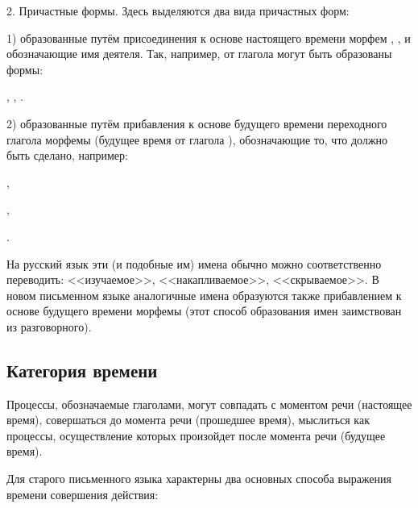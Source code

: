 2. Причастные формы. Здесь выделяются два вида причастных форм:

1) образованные путём присоединения к основе настоящего времени морфем , ,  и обозначающие имя деятеля. Так, например, от глагола  могут быть образованы формы:
\begin{prfsample}
	\item {}, , .
\end{prfsample}

2) образованные путём прибавления к основе будущего времени переходного глагола морфемы  (будущее время от глагола ), обозначающие то, что должно быть сделано, например:
\begin{prfsample}
	\item {},
	\item {},
	\item {}.
\end{prfsample}
На русский язык эти (и подобные им) имена обычно можно соответственно переводить: <<изучаемое>>, <<накапливаемое>>, <<скрываемое>>. В новом письменном языке аналогичные имена образуются также прибавлением к основе будущего времени морфемы  (этот способ образования имен заимствован из разговорного).

\subsection{Категория времени}

\label{sec:glagol:kat_vremeni}Процессы, обозначаемые глаголами, могут совпадать с моментом речи (настоящее время), совершаться до момента речи (прошедшее время), мыслиться как процессы, осуществление которых произойдет после момента речи (будущее время).

Для старого письменного языка характерны два основных способа выражения времени совершения действия:

